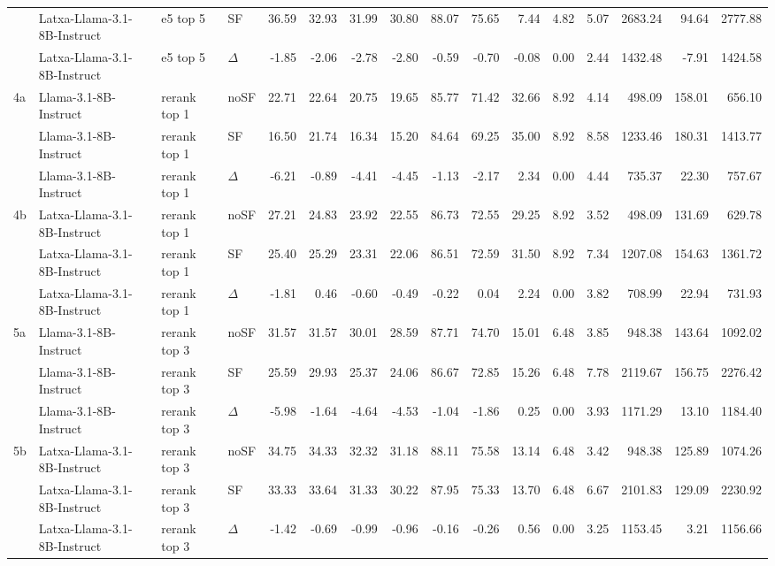 \begin{landscape}
\begin{footnotesize}
\begin{longtable}{l l l l r r r r r r r r r r r r}
 & Latxa-Llama-3.1-8B-Instruct & e5 top 5 & SF & 36.59 & 32.93 & 31.99 & 30.80 & 88.07 & 75.65 & 7.44 & 4.82 & 5.07 & 2683.24 & 94.64 & 2777.88 \\
 & Latxa-Llama-3.1-8B-Instruct & e5 top 5 & $\Delta$ & -1.85 & -2.06 & -2.78 & -2.80 & -0.59 & -0.70 & -0.08 & 0.00 & 2.44 & 1432.48 & -7.91 & 1424.58 \\
\midrule
4a & Llama-3.1-8B-Instruct & rerank top 1 & noSF & 22.71 & 22.64 & 20.75 & 19.65 & 85.77 & 71.42 & 32.66 & 8.92 & 4.14 & 498.09 & 158.01 & 656.10 \\
 & Llama-3.1-8B-Instruct & rerank top 1 & SF & 16.50 & 21.74 & 16.34 & 15.20 & 84.64 & 69.25 & 35.00 & 8.92 & 8.58 & 1233.46 & 180.31 & 1413.77 \\
 & Llama-3.1-8B-Instruct & rerank top 1 & $\Delta$ & -6.21 & -0.89 & -4.41 & -4.45 & -1.13 & -2.17 & 2.34 & 0.00 & 4.44 & 735.37 & 22.30 & 757.67 \\
4b & Latxa-Llama-3.1-8B-Instruct & rerank top 1 & noSF & 27.21 & 24.83 & 23.92 & 22.55 & 86.73 & 72.55 & 29.25 & 8.92 & 3.52 & 498.09 & 131.69 & 629.78 \\
 & Latxa-Llama-3.1-8B-Instruct & rerank top 1 & SF & 25.40 & 25.29 & 23.31 & 22.06 & 86.51 & 72.59 & 31.50 & 8.92 & 7.34 & 1207.08 & 154.63 & 1361.72 \\
 & Latxa-Llama-3.1-8B-Instruct & rerank top 1 & $\Delta$ & -1.81 & 0.46 & -0.60 & -0.49 & -0.22 & 0.04 & 2.24 & 0.00 & 3.82 & 708.99 & 22.94 & 731.93 \\
\midrule
5a & Llama-3.1-8B-Instruct & rerank top 3 & noSF & 31.57 & 31.57 & 30.01 & 28.59 & 87.71 & 74.70 & 15.01 & 6.48 & 3.85 & 948.38 & 143.64 & 1092.02 \\
 & Llama-3.1-8B-Instruct & rerank top 3 & SF & 25.59 & 29.93 & 25.37 & 24.06 & 86.67 & 72.85 & 15.26 & 6.48 & 7.78 & 2119.67 & 156.75 & 2276.42 \\
 & Llama-3.1-8B-Instruct & rerank top 3 & $\Delta$ & -5.98 & -1.64 & -4.64 & -4.53 & -1.04 & -1.86 & 0.25 & 0.00 & 3.93 & 1171.29 & 13.10 & 1184.40 \\
5b & Latxa-Llama-3.1-8B-Instruct & rerank top 3 & noSF & 34.75 & 34.33 & 32.32 & 31.18 & 88.11 & 75.58 & 13.14 & 6.48 & 3.42 & 948.38 & 125.89 & 1074.26 \\
 & Latxa-Llama-3.1-8B-Instruct & rerank top 3 & SF & 33.33 & 33.64 & 31.33 & 30.22 & 87.95 & 75.33 & 13.70 & 6.48 & 6.67 & 2101.83 & 129.09 & 2230.92 \\
 & Latxa-Llama-3.1-8B-Instruct & rerank top 3 & $\Delta$ & -1.42 & -0.69 & -0.99 & -0.96 & -0.16 & -0.26 & 0.56 & 0.00 & 3.25 & 1153.45 & 3.21 & 1156.66 \\

\end{longtable}
\end{footnotesize}
\end{landscape}
